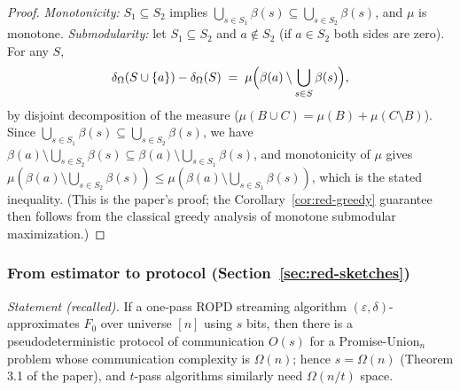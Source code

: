 \begin{proof}
\emph{Monotonicity:} $S_1 \subseteq S_2$ implies $\bigcup_{s \in S_1} \beta(s)
\subseteq \bigcup_{s \in S_2} \beta(s)$, and $\mu$ is monotone. \emph{Submodularity:}
let $S_1 \subseteq S_2$ and $a \notin S_2$ (if $a \in S_2$ both sides are zero). For
any $S$,
\[
\delta_\Omega(S \cup \{a\}) - \delta_\Omega(S)
\;=\; \mu\Bigl(\beta(a) \setminus \bigcup_{s \in S} \beta(s)\Bigr),
\]
by disjoint decomposition of the measure ($\mu(B \cup C) = \mu(B) + \mu(C \setminus
B)$). Since $\bigcup_{s \in S_1} \beta(s) \subseteq \bigcup_{s \in S_2} \beta(s)$, we
have $\beta(a) \setminus \bigcup_{s \in S_2}\beta(s) \subseteq \beta(a) \setminus
\bigcup_{s \in S_1} \beta(s)$, and monotonicity of $\mu$ gives
$\mu(\beta(a) \setminus \bigcup_{s \in S_2} \beta(s)) \le \mu(\beta(a) \setminus
\bigcup_{s \in S_1} \beta(s))$, which is the stated inequality. (This is the paper's
proof; the Corollary~\ref{cor:red-greedy} guarantee then follows from the classical
greedy analysis of monotone submodular maximization.)
\end{proof}

\subsubsection*{From estimator to protocol (Section~\ref{sec:red-sketches})}
{\itshape Statement (recalled).} If a one-pass ROPD streaming algorithm
$(\varepsilon, \delta)$-approximates $F_0$ over universe $[n]$ using $s$ bits, then
there is a pseudodeterministic protocol of communication $O(s)$ for a
Promise-Union$_n$ problem whose communication complexity is $\Omega(n)$; hence
$s = \Omega(n)$ (Theorem 3.1 of the paper), and $t$-pass algorithms similarly need
$\Omega(n/t)$ space.\eop

